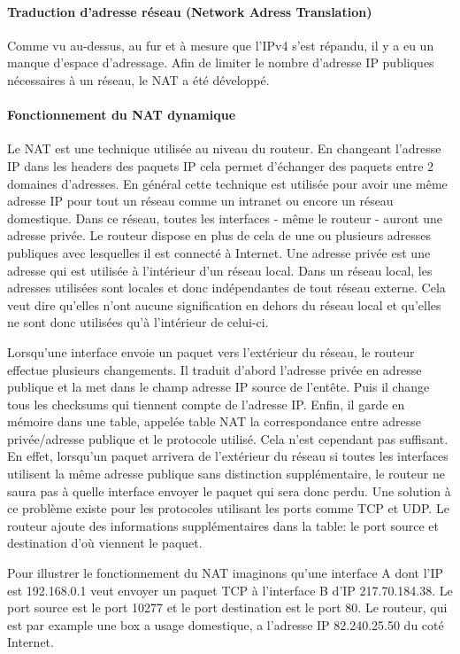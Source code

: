 \paragraph{Traduction d'adresse réseau (Network Adress Translation)}
\label{sec:nat}
Comme vu au-dessus, au fur et à mesure que l'IPv4 s'est répandu, il y a eu un manque
d'espace d'adressage. Afin de limiter le nombre d'adresse IP publiques nécessaires
à un réseau, le NAT a été développé.

\paragraph{Fonctionnement du NAT dynamique}
Le NAT est une technique utilisée au niveau du routeur. En changeant l'adresse
IP dans les headers des paquets IP cela permet d'échanger des paquets entre 2
domaines d'adresses. En général cette technique est utilisée pour avoir une
même adresse IP pour tout un réseau comme un intranet ou encore un réseau
domestique. Dans ce réseau, toutes les interfaces
- même le routeur - auront une adresse privée. Le routeur dispose en plus de
  cela de une ou plusieurs adresses publiques avec lesquelles il est connecté à
Internet. Une adresse privée est une adresse qui est utilisée à l'intérieur
d'un réseau local. Dans un réseau local, les adresses utilisées sont locales et
donc indépendantes de tout réseau externe. Cela veut dire qu'elles n'ont aucune
signification en dehors du réseau local et qu'elles ne sont donc utilisées qu'à
l'intérieur de celui-ci. 

\smallbreak
Lorsqu'une interface envoie un paquet vers l'extérieur du réseau, le routeur
effectue plusieurs changements. Il traduit d'abord l'adresse privée en adresse
publique et la met dans le champ adresse IP source de l'entête. Puis il change
tous les checksums qui tiennent compte de l'adresse IP. Enfin, il garde en
mémoire dans une table, appelée table NAT la correspondance entre adresse
privée/adresse publique et le protocole utilisé.
\smallbreak
Cela n'est cependant pas suffisant. En effet, lorsqu'un paquet arrivera de
l'extérieur du réseau si toutes les interfaces utilisent la même adresse
publique sans distinction supplémentaire, le routeur ne saura pas à quelle
interface envoyer le paquet qui sera donc perdu.
\smallbreak
Une solution à ce problème existe pour les protocoles utilisant les ports comme
TCP et UDP. Le routeur ajoute des informations supplémentaires dans la table: 
le port source et destination d'où viennent le paquet. 

\smallbreak
Pour illustrer le fonctionnement du NAT imaginons qu'une interface A dont l'IP
est 192.168.0.1 veut envoyer un paquet TCP à l'interface B d'IP 217.70.184.38.
Le port source est le port 10277 et le port destination est le port 80. Le
routeur, qui est par example une box a usage domestique, a l'adresse IP
82.240.25.50 du coté Internet.

